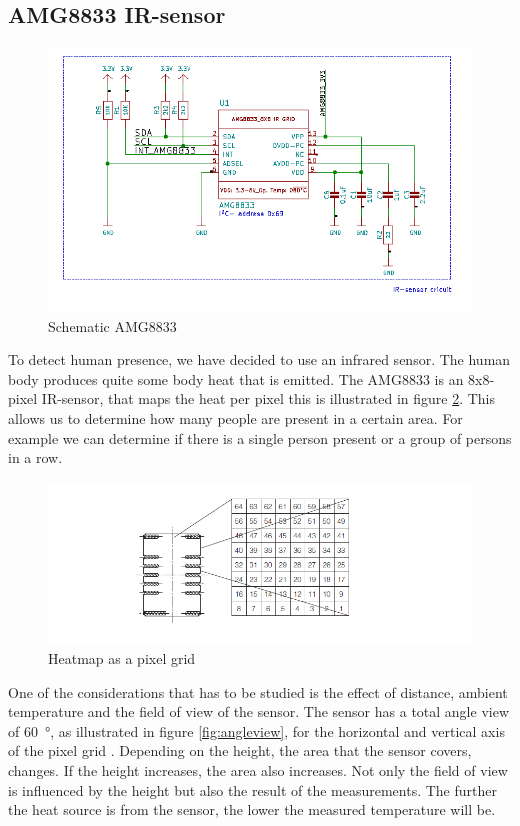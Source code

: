 \documentclass[11pt,a4paper]{article}
\begin{document}
\subsection{AMG8833 IR-sensor}
\begin{figure}[H]
	\centering
	\includegraphics[width=0.8\linewidth]{Schematic_AMG8833.png}
	\caption{Schematic AMG8833}
	\label{fig:AMG8833}
\end{figure}
To detect human presence, we have decided to use an infrared sensor. The human body produces quite some body heat that is emitted. The AMG8833 is an 8x8-pixel IR-sensor, that maps the heat per pixel this is illustrated in figure \ref{fig:heatmap}. This allows us to determine how many people are present in a certain area. For example we can determine if there is a single person present or a group of persons in a row.
\begin{figure}[H]
	\centering
	\includegraphics[width=0.8\linewidth]{heat_map_AMG8833.png}
	\caption{Heatmap as a pixel grid \cite{bib:AMG8833}}
	\label{fig:heatmap}
\end{figure}
One of the considerations that has to be studied is the effect of distance, ambient temperature and the field of view of the sensor. The sensor has a total angle view of \SI{60}{\degree}, as illustrated in figure \ref{fig:angleview}, for the horizontal and vertical axis of the pixel grid \cite{bib:AMG8833}. Depending on the height, the area that the sensor covers, changes. If the height increases, the area also increases. Not only the field of view is influenced by the height but also the result of the measurements. The further the heat source is from the sensor, the lower the measured temperature will be.
\end{document}
